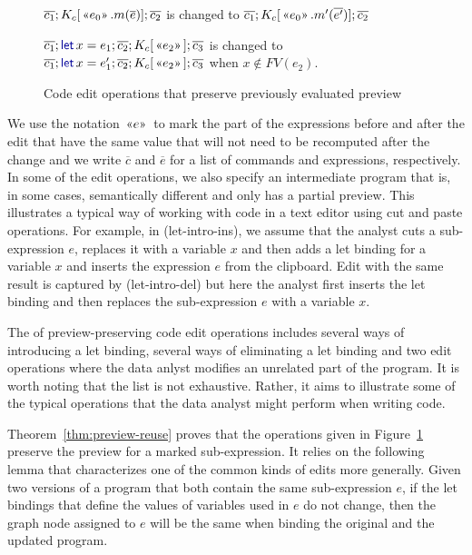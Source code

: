 \documentclass[acmsmall,anonymous,fleqn]{acmart}\settopmatter{printfolios=false,printccs=false,printacmref=false}
\theoremstyle{plain}
\theoremstyle{definition}
\newcommand{\kvd}[1]{\textnormal{\textcolor{kvdclr}{\sffamily #1}}}
\newcommand{\rname}[1]{{\sffamily\small(#1)}}
\newcommand{\ername}[1]{\vspace{0.75em}\rname{#1}\hspace{0.5em}}
\newcommand{\preview}[1]{\,\textnormal{\guillemotleft} #1\textnormal{\guillemotright}\,}
\begin{document}
\begin{figure}[t]
\begin{minipage}[c]{0.82\textwidth}
  \ername{edit-mem}
  $\overline{c_1}; K_c[\preview{e_0}.m(\overline{e})]; \overline{c_2}$ is changed to
  $\overline{c_1}; K_c[\preview{e_0}.m'(\overline{e'})]; \overline{c_2}$

  \ername{edit-let}
  $\overline{c_1}; \kvd{let}\,x=e_1; \overline{c_2}; K_c[\preview{e_2}]; \overline{c_3}$ is changed to
  $\overline{c_1}; \kvd{let}\,x=e'_1; \overline{c_2}; K_c[\preview{e_2}]; \overline{c_3}$ \hspace{2em} when
  $x\notin FV(e_2)$.
\end{minipage}

\caption{Code edit operations that preserve previously evaluated preview}
\label{fig:operations}
\end{figure}


We use the notation $\preview{e}$ to mark the part of the expressions before and after the edit
that have the same value that will not need to be recomputed after the change and we write
$\overline{c}$ and $\overline{e}$ for a list of commands and expressions, respectively.
In some of the edit operations, we also specify an intermediate program that is, in some cases,
semantically different and only has a partial preview. This illustrates a typical way of
working with code in a text editor using cut and paste operations. For example, in
\rname{let-intro-ins}, we assume that the analyst cuts a sub-expression $e$, replaces it with
a variable $x$ and then adds a let binding for a variable $x$ and inserts the expression $e$
from the clipboard. Edit with the same result is captured by \rname{let-intro-del} but here
the analyst first inserts the let binding and then replaces the sub-expression $e$ with a
variable $x$.

The of preview-preserving code edit operations includes several ways of introducing a let
binding, several ways of eliminating a let binding and two edit operations where the data anlyst
modifies an unrelated part of the program. It is worth noting that the list is not exhaustive.
Rather, it aims to illustrate some of the typical operations that the data analyst might perform
when writing code.

Theorem~\ref{thm:preview-reuse} proves that the operations given in Figure~\ref{fig:operations}
preserve the preview for a marked sub-expression. It relies on the following lemma that
characterizes one of the common kinds of edits more generally. Given two versions of a program
that both contain the same sub-expression $e$, if the let bindings that define the values of
variables used in $e$ do not change, then the graph node assigned to $e$ will be the same
when binding the original and the updated program.
\end{document}
